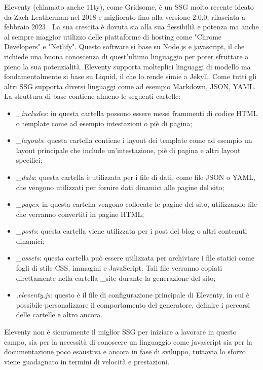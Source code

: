 \documentclass[target=bach,aauheader=]{thud}
\begin{document}
Eleventy (chiamato anche 11ty), come Gridsome, è un SSG molto recente ideato da Zach Leatherman nel 2018 e migliorato fino alla versione 2.0.0, rilasciata a febbraio 2023 \cite{eleventy-site}. 
La sua crescita è dovuta sia alla sua flessibilià e potenza ma anche al sempre maggior utilizzo delle piattaforme di hosting come "Chrome Developers" e "Netlify". \newline
Questo software si base su Node.js e javascript, il che richiede una buona conoscenza di quest'ultimo linguaggio per poter sfruttare a pieno la sua potenzialità. Eleventy supporta molteplici linguaggi di modello ma fondamentalmente si base su Liquid, il che lo rende simie a Jekyll.
Come tutti gli altri SSG supporta diversi linguaggi come ad esempio Markdown, JSON, YAML. \newline 
La struttura di base contiene almeno le seguenti cartelle:

\begin{itemize}
    \item \textit{\_includes}: in questa cartella possono essere messi frammenti di codice HTML o template come ad esempio intestazioni o piè di pagina;
    \item \textit{\_layouts}: questa cartella contiene i layout dei template come ad esempio un layout principale che include un'intestazione, piè di pagina e altri layout specifici;
    \item \textit{\_data}: questa cartella è utilizzata per i file di dati, come file JSON o YAML, che vengono utilizzati per fornire dati dinamici alle pagine del sito;
    \item \textit{\_pages}: in questa cartella vengono collocate le pagine del sito, utilizzando file che verranno convertiti in pagine HTML;
    \item \textit{\_posts}: questa cartella viene utilizzata per i post del blog o altri contenuti dinamici;
    \item \textit{\_assets}: questa cartella può essere utilizzata per archiviare i file statici come fogli di stile CSS, immagini e JavaScript. Tali file verranno copiati direttamente nella cartella \_site durante la generazione del sito;
    \item \textit{.eleventy.js}: questo è il file di configurazione principale di Eleventy, in cui è possibile personalizzare il comportamento del generatore, definire i percorsi delle cartelle e altro ancora.
\end{itemize}

Eleventy non è sicuramente il miglior SSG per iniziare a lavorare in questo campo, sia per la necessità di conoscere un linguaggio come javascript sia per la documentazione poco esaustiva e ancora in fase di sviluppo, tuttavia lo sforzo viene guadagnato in termini di velocità e prestazioni.   
\end{document}
